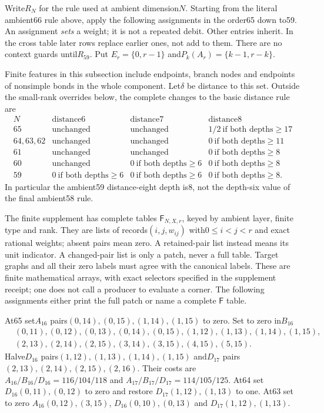 \documentclass[11pt]{article}
\theoremstyle{remark}\newtheorem{remark}[theorem]{Remark}
\begin{document}
Write$R_N$ for the rule used at ambient dimension$N$. Starting from
the literal ambient66 rule above, apply the following assignments in
the order65 down to59. An assignment \emph{sets} a weight; it is not
a repeated debit. Other entries inherit. In the cross table later
rows replace earlier ones, not add to them. There are no context
guards until$R_{59}$. Put
$E_r=\{0,r-1\}$ and$P_k(A_r)=\{k-1,r-k\}$.

Finite features in this subsection include endpoints, branch nodes
and endpoints of nonsimple bonds in the whole component. Let$\delta$
be distance to this set. Outside the small-rank overrides below,
the complete changes to the basic distance rule are
\[
\begin{array}{c|ccc}
N&\text{distance6}&\text{distance7}&\text{distance8}\\\hline
65&\text{unchanged}&\text{unchanged}&1/2\ \text{if both depths}\ge17\\
64,63,62&\text{unchanged}&\text{unchanged}&0\ \text{if both depths}\ge11\\
61&\text{unchanged}&\text{unchanged}&0\ \text{if both depths}\ge8\\
60&\text{unchanged}&0\ \text{if both depths}\ge6&0\ \text{if both depths}\ge8\\
59&0\ \text{if both depths}\ge6&0\ \text{if both depths}\ge6&
 0\ \text{if both depths}\ge8 .
\end{array}
\]
In particular the ambient59 distance-eight depth is8, not the
depth-six value of the final ambient58 rule.

The finite supplement has complete tables
$\mathsf F_{N,X,r}$, keyed by ambient layer, finite type and rank.
They are lists of records$(i,j,w_{ij})$ with$0\le i<j<r$ and exact
rational weights; absent pairs mean zero. A retained-pair list
instead means its unit indicator. A changed-pair list is only a
patch, never a full table. Target graphs and all their zero labels
must agree with the canonical labels. These are finite mathematical
arrays, with exact selectors specified in the supplement receipt;
one does not call a producer to evaluate a corner. The following
assignments either print the full patch or name a complete
$\mathsf F$ table.

At65 set$A_{16}$ pairs$(0,14),(0,15),(1,14),(1,15)$ to zero.
Set to zero in$B_{16}$
\[
\begin{split}
 &(0,11),(0,12),(0,13),(0,14),(0,15),
 (1,12),(1,13),(1,14),(1,15),\\
 &(2,13),(2,14),(2,15),(3,14),(3,15),(4,15),(5,15).
\end{split}
\]
Halve$D_{16}$ pairs$(1,12),(1,13),(1,14),(1,15)$ and$D_{17}$
pairs$(2,13),(2,14),(2,15),(2,16)$. Their costs are
$A_{16}/B_{16}/D_{16}=116/104/118$ and
$A_{17}/B_{17}/D_{17}=114/105/125$.
At64 set$D_{16}(0,11),(0,12)$ to zero and restore
$D_{17}(1,12),(1,13)$ to one.
At63 set to zero
$A_{16}(0,12),(3,15)$,
$D_{16}(0,10),(0,13)$ and
$D_{17}(1,12),(1,13)$.
\end{document}
